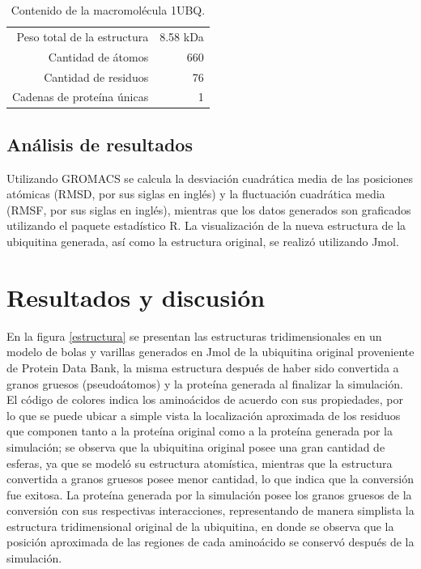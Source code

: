 \documentclass[3pt,twocolumn]{elsarticle}
\begin{document}
\begin{table}[h]
\begin{center}
\caption{Contenido de la macromolécula 1UBQ.}
\label{pdb}
\begin{tabular}{r r}
\hline
Peso total de la estructura&8.58 kDa\\
Cantidad de átomos&660\\
Cantidad de residuos&76\\
Cadenas de proteína únicas&1\\
\hline
\end{tabular}
\end{center}
\end{table}
\subsection{Análisis de resultados}
Utilizando GROMACS se calcula la desviación cuadrática media de las posiciones atómicas (RMSD, por sus siglas en inglés) y la fluctuación cuadrática media (RMSF, por sus siglas en inglés), mientras que los datos generados son graficados utilizando el paquete estadístico R. La visualización de la nueva estructura de la ubiquitina generada, así como la estructura original, se realizó utilizando Jmol.

\section{Resultados y discusión}
En la figura \ref{estructura} se presentan las estructuras tridimensionales en un modelo de bolas y varillas generados en Jmol de la ubiquitina original proveniente de Protein Data Bank, la misma estructura después de haber sido convertida a granos gruesos (pseudoátomos) y la proteína generada al finalizar la simulación. El código de colores indica los aminoácidos de acuerdo con sus propiedades, por lo que se puede ubicar a simple vista la localización aproximada de los residuos que componen tanto a la proteína original como a la proteína generada por la simulación; se observa que la ubiquitina original posee una gran cantidad de esferas, ya que se modeló su estructura atomística, mientras que la estructura convertida a granos gruesos posee menor cantidad, lo que indica que la conversión fue exitosa. La proteína generada por la simulación posee los granos gruesos de la conversión con sus respectivas interacciones, representando de manera simplista la estructura tridimensional original de la ubiquitina, en donde se observa que la posición aproximada de las regiones de cada aminoácido se conservó después de la simulación.
\end{document}
